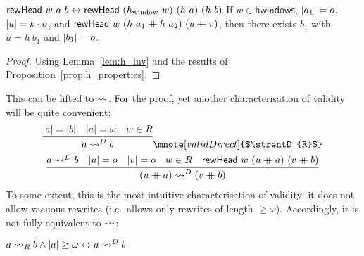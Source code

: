 \begin{lemma}\label{lem:rewHead_agree}\leavevmode
  \begin{enumerate}
     $\rewHead{w}{a}{b} \leftrightarrow \rewHead{(h_{\text{window}}~w)}{(h~a)}{(h~b)}$
     If $w \in \textsf{hwindows}$, $\length{a_1} = o$, $\length{u} = k \cdot o$, and $\rewHead{w}{(h~a_1 \concat h~a_2)}{(u \concat v)}$, then there exists $b_1$ with $u = h~b_1$ and $\length{b_1} = o$.
  \end{enumerate}
\end{lemma}
\begin{proof}
  Using Lemma~\ref{lem:h_inv} and the results of Proposition~\ref{prop:h_properties}.
\end{proof}

This can be lifted to $\strent{}$. For the proof, yet another characterisation of validity will be quite convenient:
\begin{gather*}
  \infer{a \strentD{R} b}{\length{a} = \length{b} \quad \length{a} = \omega \quad w \in R}
  \mnote[validDirect]{$\strentD{R}$}\\
  \infer{(u \concat a) \strentD{R} (v \concat b)}{a \strentD{R} b \quad \length{u} = o \quad \length{v} = o \quad w \in R \quad \rewHead{w}{(u \concat a)}{(v \concat b)}}
\end{gather*}
To some extent, this is the most intuitive characterisation of validity: it does not allow vacuous rewrites (i.e.\ allows only rewrites of length $\ge \omega$). Accordingly, it is not fully equivalent to $\strent{}$:
\begin{lemma}
  $a \strent{R} b \land \length{a} \ge \omega \leftrightarrow a \strentD{R} b$
\end{lemma}

